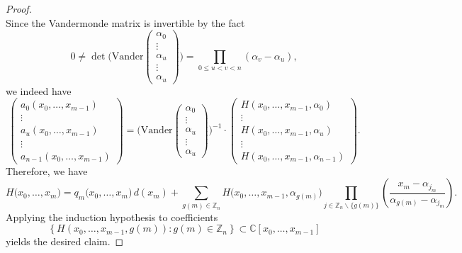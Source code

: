 \begin{proof}
\begin{equation}
\end{equation}
Since the Vandermonde matrix is invertible by the fact
\begin{equation}
0\ne\det\bigg(\text{Vander}\left(\begin{array}{c}
\alpha_{0}\\
\vdots\\
\alpha_{u}\\
\vdots\\
\alpha_{u}
\end{array}\right)\bigg)=\prod_{0\le u<v<n}(\alpha_{v}-\alpha_{u}),
 \end{equation}
we indeed have 
\begin{equation}
\left(\begin{array}{c}
a_{0}\left(x_{0},\ldots,x_{m-1}\right)\\
\vdots\\
a_{u}\left(x_{0},\ldots,x_{m-1}\right)\\
\vdots\\
a_{n-1}\left(x_{0},\ldots,x_{m-1}\right)
\end{array}\right)=\bigg(\text{Vander}\left(\begin{array}{c}
\alpha_{0}\\
\vdots\\
\alpha_{u}\\
\vdots\\
\alpha_{u}
\end{array}\right)\bigg)^{-1}\cdot\left(\begin{array}{c}
H(x_{0},\ldots,x_{m-1},\alpha_{0})\\
\vdots\\
H(x_{0},\ldots,x_{m-1},\alpha_{u})\\
\vdots\\
H(x_{0},\ldots,x_{m-1},\alpha_{n-1})
\end{array}\right).
\end{equation}
Therefore, we have 
\begin{equation}
H\big(x_{0},\ldots,x_{m}\big)
= q_{m}\big(x_{0},\ldots,x_{m}\big)\,d(x_{m})+\sum_{g(m)\in\mathbb{Z}_{n}}H\big(x_{0},\ldots,x_{m-1},\alpha_{g(m)}\big)\prod_{j\in\mathbb{Z}_{n}\backslash\{g(m)\}}\left(\frac{x_{m}-\alpha_{j_{m}}}{\alpha_{g(m)}-\alpha_{j_{m}}}\right).
\end{equation}
Applying the induction hypothesis to coefficients
\[
\left\{ H\left(x_{0},\ldots,x_{m-1},g\left(m\right)\right):g\left(m\right)\in\mathbb{Z}_{n}\right\} \subset\mathbb{C}[x_{0},\ldots,x_{m-1}]
\]
yields the desired claim.
\end{proof}
